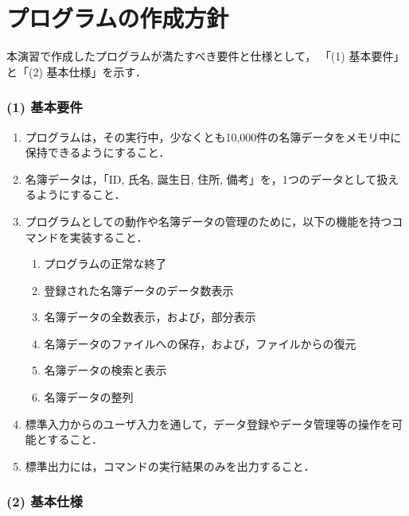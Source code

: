\documentclass[autodetect-engine,dvi=dvipdfmx,ja=standard,
               a4j,11pt]{bxjsarticle}
\begin{document}
\section{プログラムの作成方針} \label{sec:2}

本演習で作成したプログラムが満たすべき要件と仕様として，
「(1) 基本要件」と「(2) 基本仕様」を示す．

\subsubsection*{(1) 基本要件}

\begin{enumerate}
  \setlength{\parskip}{0em} \setlength{\itemsep}{0.25em}
    \item プログラムは，その実行中，少なくとも10,000件の名簿データをメモリ中に保持できるようにすること．
    \item 名簿データは，「ID, 氏名, 誕生日, 住所, 備考」を，1つのデータとして扱えるようにすること．
    \item プログラムとしての動作や名簿データの管理のために，以下の機能を持つコマンドを実装すること．
    \begin{enumerate} \setlength{\parskip}{0em} \setlength{\itemsep}{0.25em}
        \item プログラムの正常な終了
        \item 登録された名簿データのデータ数表示
        \item 名簿データの全数表示，および，部分表示
        \item 名簿データのファイルへの保存，および，ファイルからの復元
        \item 名簿データの検索と表示
        \item 名簿データの整列
    \end{enumerate}
    \item 標準入力からのユーザ入力を通して，データ登録やデータ管理等の操作を可能とすること．
    \item 標準出力には，コマンドの実行結果のみを出力すること．
\end{enumerate}

\subsubsection*{(2) 基本仕様}
\end{document}
